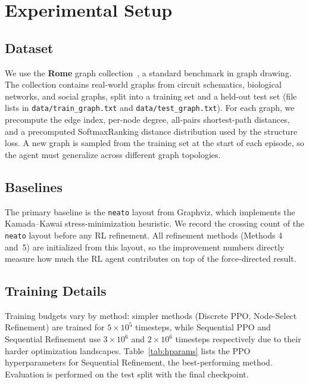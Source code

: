 \documentclass[10pt,twocolumn]{article}
\begin{document}
\section{Experimental Setup}
\label{sec:experiments}

\subsection{Dataset}

We use the \textbf{Rome} graph collection~\cite{didimo2011rome}, a standard
benchmark in graph drawing.  The collection contains real-world graphs from
circuit schematics, biological networks, and social graphs, split into a
training set and a held-out test set (file lists in
\texttt{data/train\_graph.txt} and \texttt{data/test\_graph.txt}).
For each graph, we precompute the edge index, per-node degree, all-pairs
shortest-path distances, and a precomputed SoftmaxRanking distance
distribution used by the structure loss.  A new graph is sampled from the
training set at the start of each episode, so the agent must generalize
across different graph topologies.

\subsection{Baselines}

The primary baseline is the \texttt{neato} layout from Graphviz, which
implements the Kamada--Kawai stress-minimization heuristic.  We record the
crossing count of the \texttt{neato} layout before any RL refinement.  All
refinement methods (Methods 4 and~5) are initialized from this layout, so
the improvement numbers directly measure how much the RL agent contributes
on top of the force-directed result.

\subsection{Training Details}

Training budgets vary by method: simpler methods (Discrete PPO, Node-Select
Refinement) are trained for $5\times10^5$ timesteps, while Sequential PPO
and Sequential Refinement use $3\times10^6$ and $2\times10^6$ timesteps
respectively due to their harder optimization landscapes.
Table~\ref{tab:hparams} lists the PPO hyperparameters for Sequential
Refinement, the best-performing method.  Evaluation is performed on the
test split with the final checkpoint.
\end{document}
